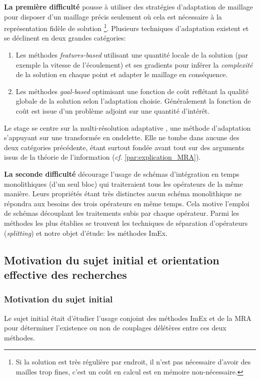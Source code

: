     \textbf{La première difficulté} pousse à utiliser des stratégies d'adaptation de maillage pour disposer d'un maillage précis seulement où cela est nécessaire à la représentation fidèle de solution
    \footnote{Si la solution est très régulière par endroit, il n'est pas nécessaire d'avoir des mailles trop fines, c'est un coût en calcul est en mémoire non-nécessaire.}.
    Plusieurs techniques d'adaptation existent et se déclinent en deux grandes catégories\cite{Vivarelli2025Fluids}:
    \begin{enumerate}
        \item Les méthodes \textit{features-based} utilisant une quantité locale de la solution (par exemple la vitesse de l'écoulement) 
        et ses gradients pour inférer la \textit{complexité} de la solution en chaque point et adapter le maillage en conséquence.
        \item Les méthodes \textit{goal-based} optimisant une fonction de coût reflétant la qualité globale de la solution selon l'adaptation choisie.
        Généralement la fonction de coût est issue d'un problème adjoint sur une quantité d’intérêt.
    \end{enumerate}
    Le stage se centre sur la multi-résolution adaptative \cite{harten1994}, une méthode d'adaptation s'appuyant sur une transformée en ondelette.
    Elle ne tombe dans aucune des deux catégories précédente, étant surtout fondée avant tout sur des arguments issus de la théorie de l'information 
    (\textit{cf.} \ref{par:explication_MRA}).\par

    \textbf{La seconde difficulté} décourage l'usage de schémas d'intégration en temps monolithiques (d'un seul bloc) qui traiteraient tous les opérateurs de la même manière.
    Leurs propriétés étant très distinctes aucun schéma monolithique ne répondra aux besoins des trois opérateurs en même temps.
    Cela motive l'emploi de schémas découplant les traitements subis par chaque opérateur. Parmi les méthodes les plus établies se trouvent 
    les techniques de séparation d'opérateurs (\textit{splitting}) et notre objet d'étude: les méthodes ImEx.

\subsection{Motivation du sujet initial et orientation effective des recherches}
    \subsubsection{Motivation du sujet initial}
    Le sujet initial était d'étudier l'usage conjoint des méthodes ImEx et de la MRA pour déterminer l’existence ou non de couplages délétères entre ces deux méthodes.\par 

